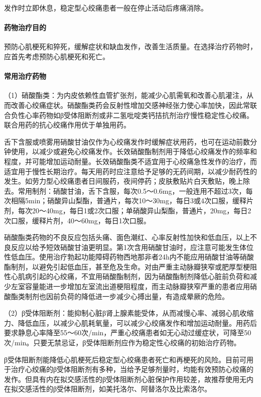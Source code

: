 发作时立即休息，稳定型心绞痛患者一般在停止活动后疼痛消除。
\paragraph{药物治疗目的}

预防心肌梗死和猝死，缓解症状和缺血发作，改善生活质量。在选择治疗药物时，应首先考虑预防心肌梗死和死亡。
\paragraph{常用治疗药物}

（1）硝酸酯类：为内皮依赖性血管扩张剂，能减少心肌需氧和改善心肌灌注，从而改善心绞痛症状。硝酸酯类药会反射性增加交感神经张力使心率加快，因此常联合负性心率药物如β受体阻断剂或非二氢吡啶类钙拮抗剂治疗慢性稳定性心绞痛。联合用药的抗心绞痛作用优于单独用药。

舌下含服或喷雾用硝酸甘油仅作为心绞痛发作时缓解症状用药，也可在运动前数分钟使用，以减少或避免心绞痛发作。长效硝酸酯制剂用于降低心绞痛发作的频率和程度，并可能增加运动耐量。长效硝酸酯类不适宜用于心绞痛急性发作的治疗，而适宜用于慢性长期治疗。每天用药时应注意给予足够的无药间期，以减少耐药性的发生。如劳力型心绞痛患者日间服药，夜间停药；皮肤敷贴片白天敷贴，晚上除去。常用制剂：硝酸甘油，舌下含服，每次0.5～0.6mg，一般连用不超过3次，每次相隔5min；硝酸异山梨酯，普通片，每次10～30mg，每日3或4次口服，缓释片剂，每次20～40mg，每日1或2次口服；单硝酸异山梨酯，普通片，20mg，每日2次口服，缓释片剂，40～60mg，每日1次口服。

硝酸酯类药物的不良反应包括头痛、面色潮红、心率反射性加快和低血压，以上不良反应以给予短效硝酸甘油更明显。第1次含用硝酸甘油时，应注意可能发生体位性低血压。使用治疗勃起功能障碍药物西地那非者24h内不能应用硝酸甘油等硝酸酯制剂，以避免引起低血压，甚至危及生命。对由严重主动脉瓣狭窄或肥厚型梗阻性心肌病引起的心绞痛，不宜用硝酸酯制剂，因为硝酸酯制剂降低心脏前负荷和减少左室容量能进一步增加左室流出道梗阻程度，而主动脉瓣狭窄严重的患者应用硝酸酯类制剂也因前负荷的降低进一步减少心搏出量，有造成晕厥的危险。

（2）β受体阻断剂：能抑制心脏β肾上腺素能受体，从而减慢心率、减弱心肌收缩力、降低血压，以减少心肌耗氧量，可以减少心绞痛发作和增加运动耐量。用药后要求静息心率降至55～60次/min，严重心绞痛患者如无心动过缓症状，可降至50次/min。只要无禁忌证，β受体阻断剂应作为稳定性心绞痛的初始治疗药物。

β受体阻断剂能降低心肌梗死后稳定型心绞痛患者死亡和再梗死的风险。目前可用于治疗心绞痛的β受体阻断剂有多种，当给予足够剂量时，均能有效预防心绞痛的发作。但具有内在拟交感活性的β受体阻断剂心脏保护作用较差，故推荐使用无内在拟交感活性的β受体阻断剂，如美托洛尔、阿替洛尔及比索洛尔。

